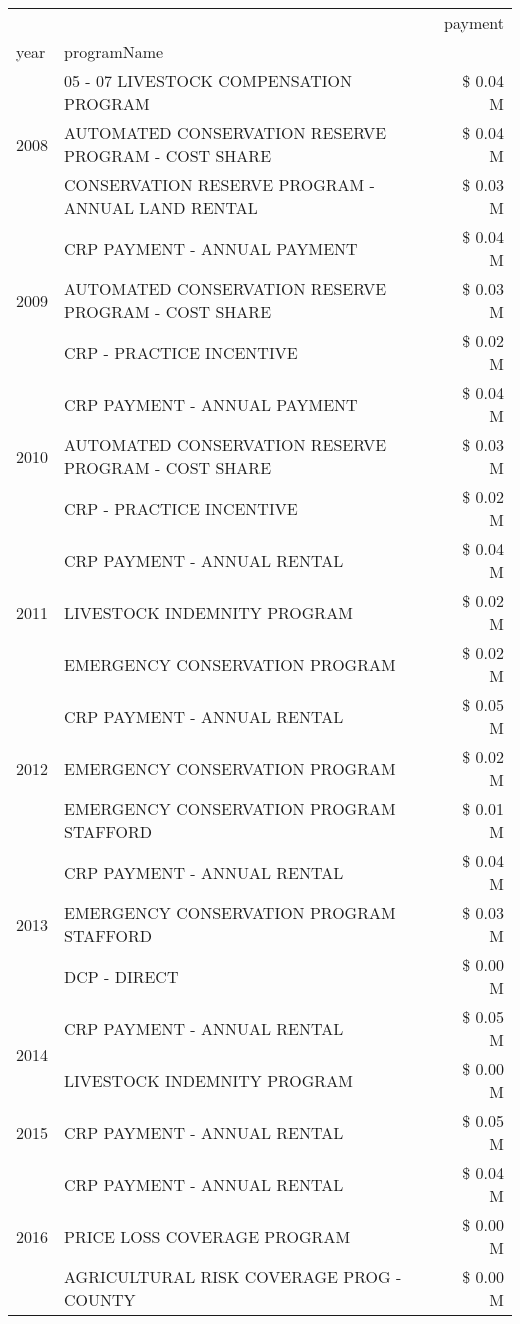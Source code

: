 \begin{tabular}{llr}
\toprule
 &  & payment \\
year & programName &  \\
\midrule
\multirow[t]{3}{*}{2008} & 05 - 07 LIVESTOCK COMPENSATION PROGRAM & \$ 0.04 M \\
 & AUTOMATED CONSERVATION RESERVE PROGRAM - COST SHARE & \$ 0.04 M \\
 & CONSERVATION RESERVE PROGRAM - ANNUAL LAND RENTAL & \$ 0.03 M \\
\cline{1-3}
\multirow[t]{3}{*}{2009} & CRP PAYMENT - ANNUAL PAYMENT & \$ 0.04 M \\
 & AUTOMATED CONSERVATION RESERVE PROGRAM - COST SHARE & \$ 0.03 M \\
 & CRP - PRACTICE INCENTIVE & \$ 0.02 M \\
\cline{1-3}
\multirow[t]{3}{*}{2010} & CRP PAYMENT - ANNUAL PAYMENT & \$ 0.04 M \\
 & AUTOMATED CONSERVATION RESERVE PROGRAM - COST SHARE & \$ 0.03 M \\
 & CRP - PRACTICE INCENTIVE & \$ 0.02 M \\
\cline{1-3}
\multirow[t]{3}{*}{2011} & CRP PAYMENT - ANNUAL RENTAL & \$ 0.04 M \\
 & LIVESTOCK INDEMNITY PROGRAM & \$ 0.02 M \\
 & EMERGENCY CONSERVATION PROGRAM & \$ 0.02 M \\
\cline{1-3}
\multirow[t]{3}{*}{2012} & CRP PAYMENT - ANNUAL RENTAL & \$ 0.05 M \\
 & EMERGENCY CONSERVATION PROGRAM & \$ 0.02 M \\
 & EMERGENCY CONSERVATION PROGRAM STAFFORD & \$ 0.01 M \\
\cline{1-3}
\multirow[t]{3}{*}{2013} & CRP PAYMENT - ANNUAL RENTAL & \$ 0.04 M \\
 & EMERGENCY CONSERVATION PROGRAM STAFFORD & \$ 0.03 M \\
 & DCP - DIRECT & \$ 0.00 M \\
\cline{1-3}
\multirow[t]{2}{*}{2014} & CRP PAYMENT - ANNUAL RENTAL & \$ 0.05 M \\
 & LIVESTOCK INDEMNITY PROGRAM & \$ 0.00 M \\
\cline{1-3}
2015 & CRP PAYMENT - ANNUAL RENTAL & \$ 0.05 M \\
\cline{1-3}
\multirow[t]{3}{*}{2016} & CRP PAYMENT - ANNUAL RENTAL & \$ 0.04 M \\
 & PRICE LOSS COVERAGE PROGRAM & \$ 0.00 M \\
 & AGRICULTURAL RISK COVERAGE PROG - COUNTY & \$ 0.00 M \\

\end{tabular}
